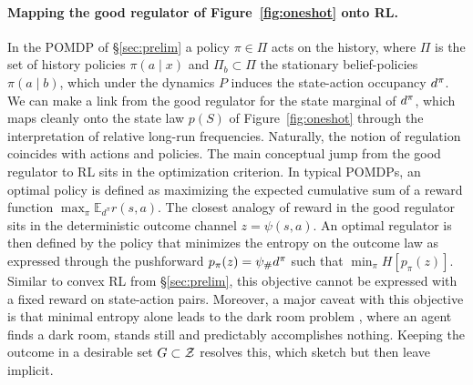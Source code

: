 \paragraph{Mapping the good regulator of Figure~\ref{fig:oneshot} onto RL.}
In the POMDP of \S\ref{sec:prelim} a policy $\pi \in \Pi$ acts on the history, where $\Pi$ is the set of history policies $\pi(a \mid x)$ and $\Pi_b \subset \Pi$ the stationary belief-policies $\pi(a \mid b)$, which under the dynamics $P$ induces the state-action occupancy $d^{\pi}$.
We can make a link from the good regulator for the state marginal of $d^{\pi}$, which maps cleanly onto the state law $p(S)$ of Figure~\ref{fig:oneshot} through the interpretation of relative long-run frequencies.
Naturally, the notion of regulation coincides with actions and policies.
The main conceptual jump from the good regulator to RL sits in the optimization criterion. 
In typical POMDPs, an optimal policy is defined as maximizing the expected cumulative sum of a reward function $\max_\pi \mathbb{E}_{d^\pi} r(s, a)$.
The closest analogy of reward in the good regulator sits in the deterministic outcome channel $z = \psi(s,a)$.
An optimal regulator is then defined by the policy that minimizes the entropy on the outcome law as expressed through the pushforward $p_\pi(z) = \psi_\#d^{\pi}$ such that $\min_\pi H[p_\pi(z)]$.
Similar to convex RL from \S\ref{sec:prelim}, this objective cannot be expressed with a fixed reward on state-action pairs.
Moreover, a major caveat with this objective is that minimal entropy alone leads to the dark room problem \citep{Friston-dark12}, where an agent finds a dark room, stands still and predictably accomplishes nothing.
Keeping the outcome in a desirable set $G \subset \mathcal Z$ resolves this, which \citet{Conant-good70} sketch but then leave implicit.

